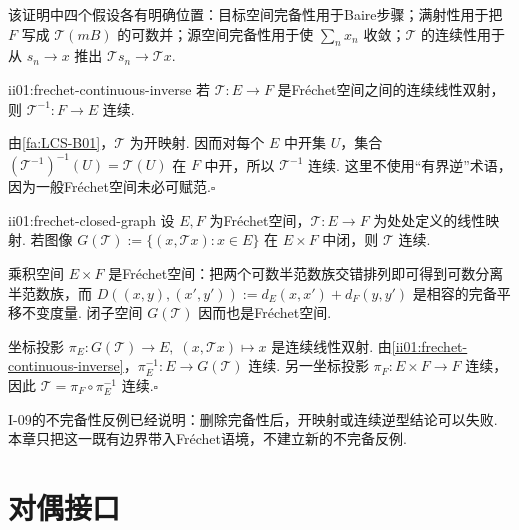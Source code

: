 该证明中四个假设各有明确位置：目标空间完备性用于Baire步骤；满射性用于把 \(\displaystyle F\) 写成 \(\displaystyle \mathcal T(mB)\) 的可数并；源空间完备性用于使 \(\displaystyle \sum_nx_n\) 收敛；\(\displaystyle \mathcal T\) 的连续性用于从 \(\displaystyle s_n\to x\) 推出 \(\displaystyle \mathcal Ts_n\to\mathcal Tx\).

\begin{FACorollary}[B][Fr\'echet连续逆]{ii01:frechet-continuous-inverse}
若 \(\displaystyle \mathcal T:E\to F\) 是Fr\'echet空间之间的连续线性双射，则 \(\displaystyle \mathcal T^{-1}:F\to E\) 连续.
\end{FACorollary}

\begin{FAProof}
由\autoref{fa:LCS-B01}，\(\displaystyle \mathcal T\) 为开映射. 因而对每个 \(\displaystyle E\) 中开集 \(\displaystyle U\)，集合 \(\displaystyle (\mathcal T^{-1})^{-1}(U)=\mathcal T(U)\) 在 \(\displaystyle F\) 中开，所以 \(\displaystyle \mathcal T^{-1}\) 连续. 这里不使用“有界逆”术语，因为一般Fr\'echet空间未必可赋范.\hfill\(\square\)
\end{FAProof}

\begin{FACorollary}[B][Fr\'echet闭图像推论]{ii01:frechet-closed-graph}
设 \(\displaystyle E,F\) 为Fr\'echet空间，\(\displaystyle \mathcal T:E\to F\) 为处处定义的线性映射. 若图像
\(\displaystyle G(\mathcal T) := \{(x,\mathcal Tx):x\in E\}\)
在 \(\displaystyle E\times F\) 中闭，则 \(\displaystyle \mathcal T\) 连续.
\end{FACorollary}

\begin{FAProof}
乘积空间 \(\displaystyle E\times F\) 是Fr\'echet空间：把两个可数半范数族交错排列即可得到可数分离半范数族，而 \(\displaystyle D((x,y),(x',y')):=d_E(x,x')+d_F(y,y')\) 是相容的完备平移不变度量. 闭子空间 \(\displaystyle G(\mathcal T)\) 因而也是Fr\'echet空间.

坐标投影
\(\displaystyle \pi_E:G(\mathcal T)\to E,\; (x,\mathcal Tx)\mapsto x\)
是连续线性双射. 由\autoref{ii01:frechet-continuous-inverse}，\(\displaystyle \pi_E^{-1}:E\to G(\mathcal T)\) 连续. 另一坐标投影 \(\displaystyle \pi_F:E\times F\to F\) 连续，因此
\(\displaystyle \mathcal T = \pi_F\circ\pi_E^{-1}\)
连续.\hfill\(\square\)
\end{FAProof}

I-09的不完备性反例已经说明：删除完备性后，开映射或连续逆型结论可以失败. 本章只把这一既有边界带入Fr\'echet语境，不建立新的不完备反例.

\section{对偶接口}\label{sec:ii01-dual-interface}

